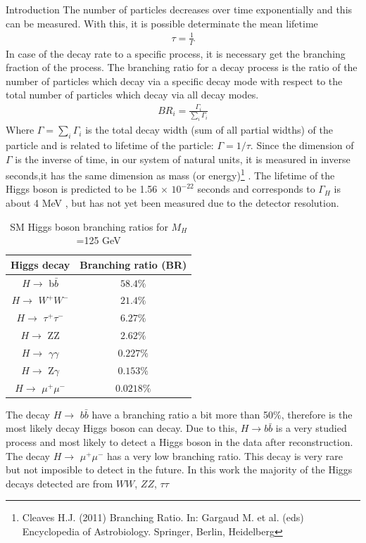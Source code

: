 \begin{chapter}{Introduction}
The number of particles decreases over time exponentially and this can be measured. With this, it is possible determinate the mean lifetime\cite{griff}
\begin{align}
\tau=\frac{1}{\Gamma}
\end{align}
In case of  the decay rate to a specific process, it is necessary get the branching fraction of the process. 
The branching ratio for a decay process is the ratio of the number of particles which decay via a specific decay mode with respect to the total number of particles which decay via all decay modes.
\begin{align}
BR_i =\frac{\Gamma_i}{\sum_{i}\Gamma_i}
\end{align}
Where $\Gamma=\sum_i\Gamma_i$ is the total decay width (sum of all partial widths) of the particle and is related to lifetime of the particle: $\Gamma=1/\tau$.
Since the dimension of $\Gamma$ is the inverse of time, in our system of natural units, it is measured in inverse seconds,it has the same dimension as mass (or energy)\footnote{Cleaves H.J. (2011) Branching Ratio. In: Gargaud M. et al. (eds) Encyclopedia of Astrobiology. Springer, Berlin, Heidelberg} . The lifetime of the Higgs boson is predicted to be 1.56 $\times$ $10^{-22}$ seconds and corresponds to $\Gamma_H$ is about 4 MeV , but has not yet been measured due to the detector resolution\cite{cms-manual}.
\\
\begin{table}[!htbp] 
\caption[SM Higgs boson branching ratios for  $M_H$ =125 GeV]{SM Higgs boson branching ratios for  $M_H$ =125 GeV \protect \cite{pd}}
\centering
\begin{tabular}{|c|c|}
\hline
Higgs decay & Branching ratio (BR)\\
\hline
$H \rightarrow$ b$\bar{b}$ &$58.4\%$ \\
\hline
 $H \rightarrow$ $W^+W^-$ &$21.4\%$ \\
\hline
$H \rightarrow$ $\tau^+ \tau^-$ & $6.27\%$\\
\hline
$H \rightarrow$ ZZ &$2.62\%$\\
\hline
$H \rightarrow$ $\gamma\gamma$ &$0.227\%$\\
\hline
$H \rightarrow$ Z$\gamma$ &$0.153\%$\\
\hline
$H \rightarrow$ $\mu^+\mu^-$ &$0.0218\%$\\
\hline
\end{tabular}
\label{higgs1}
\end{table}
The decay  $H \rightarrow$ $b\bar{b}$ have a branching ratio a bit more than 50$\%$, therefore is the most likely decay Higgs boson can decay. Due to this,  $H\rightarrow b\bar{b}$ is a very studied process and most likely to detect a Higgs boson in the data after reconstruction. The decay  $H \rightarrow$ $\mu^+\mu^-$ has a very low branching ratio. This decay is very rare but not imposible to detect in the future.  In this work the majority of the Higgs decays detected are from $WW$, $ZZ$, $\tau \tau$\\


\end{chapter}
